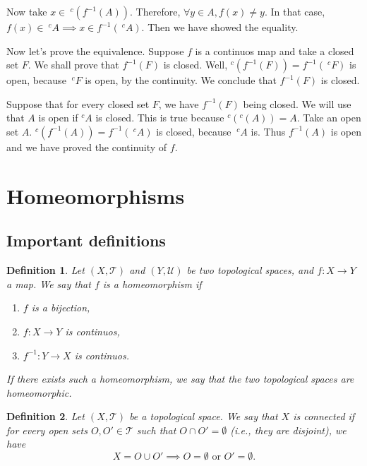 \documentclass[a4paper,11pt]{article}
\theoremstyle{mytheor}
\newtheorem{definition}{Definition}[subsection]
\theoremstyle{mytheor}
\theoremstyle{remark}
\newcommand{\T}{\mathcal{T}}
\begin{document}
Now take $x \in ~^c(f^{-1}(A))$. Therefore, $\forall y \in A, f(x) \neq y$. In
that case, $f(x) \in ~^cA \implies x \in f^{-1}(~^cA)$. Then we have showed
the equality. 

\vspace{5mm}

Now let's prove the equivalence. Suppose $f$ is a continuos map and take a
closed set $F$. We shall prove that $f^{-1}(F)$ is closed. Well, $^c(f^{-1}(F))
= f^{-1}(~^cF)$ is open, because $~^cF$ is open, by the continuity. We
conclude that $f^{-1}(F)$ is closed. 

Suppose that for every closed set $F$, we have $f^{-1}(F)$ being closed. We
will use that $A$ is open if $^cA$ is closed. This is true because $^c(^c(A))
= A$. Take an open set $A$. $^c(f^{-1}(A)) = f^{-1}(~^cA)$
is closed, because $~^cA$ is. Thus $f^{-1}(A)$ is open and we have proved the
continuity of $f$. 


\section{Homeomorphisms}

\subsection{Important definitions}

\begin{definition}
    Let $(X, \T)$ and $(Y, \mathcal{U})$ be two topological spaces, and $f : X
    \to Y$ a map. We say that $f$ is a homeomorphism if
    \begin{enumerate}
        \item $f$ is a bijection, 
        \item $f : X \to Y$ is continuos, 
        \item $f^{-1} : Y \to X$ is continuos.
    \end{enumerate}
    If there exists such a homeomorphism, we say that the two topological
    spaces are homeomorphic.
\end{definition}

\begin{definition}
    Let $(X, \T)$ be a topological space. We say that $X$ is connected if for
    every open sets $O, O' \in \T$ such that $O \cap O' = \emptyset$ (i.e.,
    they are disjoint), we have
    $$X = O \cup O' \implies O = \emptyset \text{ or } O' = \emptyset.$$
\end{definition}
\end{document}
